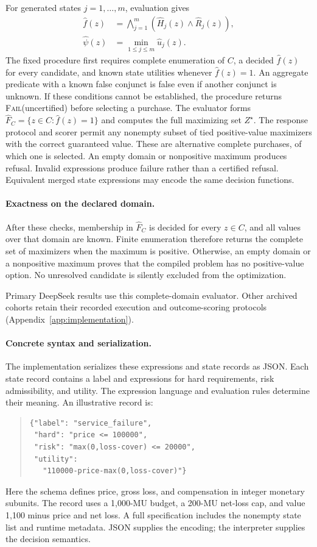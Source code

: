 For generated states $j=1,\ldots,m$, evaluation gives
\begin{align}
\widehat f(z)&=\bigwedge_{j=1}^{m}(\widehat H_j(z)\wedge\widehat R_j(z)),\\
\widehat\psi(z)&=\min_{1\le j\le m}\widehat u_j(z).
\end{align}
The fixed procedure first requires complete enumeration of $C$, a decided $\widehat f(z)$ for every candidate, and known state utilities whenever $\widehat f(z)=1$. An aggregate predicate with a known false conjunct is false even if another conjunct is unknown. If these conditions cannot be established, the procedure returns \textsc{Fail}(uncertified) before selecting a purchase. The evaluator forms $\widehat F_C=\{z\in C:\widehat f(z)=1\}$ and computes the full maximizing set $Z^\star$. The response protocol and scorer permit any nonempty subset of tied positive-value maximizers with the correct guaranteed value. These are alternative complete purchases, of which one is selected. An empty domain or nonpositive maximum produces refusal. Invalid expressions produce failure rather than a certified refusal. Equivalent merged state expressions may encode the same decision functions.

\paragraph{Exactness on the declared domain.}
After these checks, membership in $\widehat F_C$ is decided for every $z\in C$, and all values over that domain are known. Finite enumeration therefore returns the complete set of maximizers when the maximum is positive. Otherwise, an empty domain or a nonpositive maximum proves that the compiled problem has no positive-value option. No unresolved candidate is silently excluded from the optimization.

Primary DeepSeek results use this complete-domain evaluator. Other archived cohorts retain their recorded execution and outcome-scoring protocols (Appendix~\ref{app:implementation}).

\paragraph{Concrete syntax and serialization.}
The implementation serializes these expressions and state records as JSON. Each state record contains a label and expressions for hard requirements, risk admissibility, and utility. The expression language and evaluation rules determine their meaning. An illustrative record is:
\begin{quote}\small
\begin{verbatim}
{"label": "service_failure",
 "hard": "price <= 100000",
 "risk": "max(0,loss-cover) <= 20000",
 "utility":
   "110000-price-max(0,loss-cover)"}
\end{verbatim}
\end{quote}
Here the schema defines price, gross loss, and compensation in integer monetary subunits. The record uses a 1,000-MU budget, a 200-MU net-loss cap, and value 1,100 minus price and net loss. A full specification includes the nonempty state list and runtime metadata. JSON supplies the encoding; the interpreter supplies the decision semantics.


